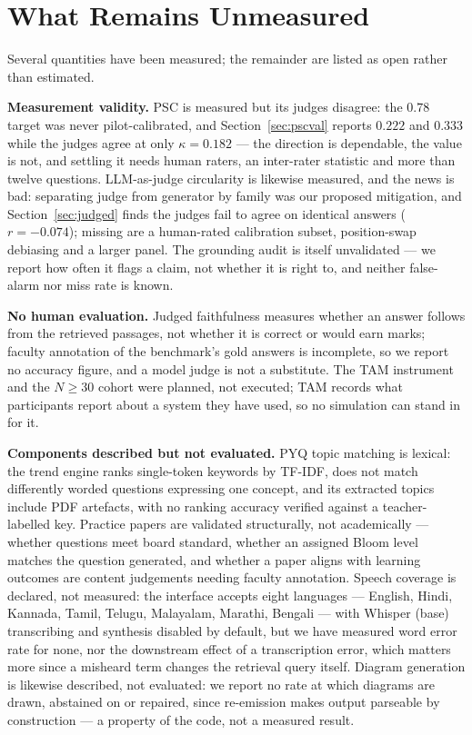 \documentclass[conference]{IEEEtran}
\begin{document}
\section{What Remains Unmeasured}
\label{sec:limits}
Several quantities have been measured; the remainder are listed as open rather
than estimated.

\textbf{Measurement validity.} PSC is measured but its judges disagree: the
$0.78$ target was never pilot-calibrated, and Section~\ref{sec:pscval} reports
$0.222$ and $0.333$ while the judges agree at only $\kappa = 0.182$ --- the
direction is dependable, the value is not, and settling it needs human raters,
an inter-rater statistic and more than twelve questions. LLM-as-judge
circularity is likewise measured, and the news is bad: separating judge from
generator by family was our proposed mitigation, and
Section~\ref{sec:judged} finds the judges fail to agree on identical answers
($r = -0.074$); missing are a human-rated calibration subset, position-swap
debiasing and a larger panel. The grounding audit is itself unvalidated --- we
report how often it flags a claim, not whether it is right to, and neither
false-alarm nor miss rate is known.

\textbf{No human evaluation.} Judged faithfulness measures whether an answer
follows from the retrieved passages, not whether it is correct or would earn
marks; faculty annotation of the benchmark's gold answers is incomplete, so we
report no accuracy figure, and a model judge is not a substitute. The TAM
instrument~\cite{davis1989} and the $N \geq 30$ cohort were planned, not
executed; TAM records what participants report about a system they have used, so
no simulation can stand in for it.

\textbf{Components described but not evaluated.} PYQ topic matching is lexical:
the trend engine ranks single-token keywords by TF-IDF, does not match
differently worded questions expressing one concept, and its extracted topics
include PDF artefacts, with no ranking accuracy verified against a
teacher-labelled key. Practice papers are validated structurally, not
academically --- whether questions meet board standard, whether an assigned
Bloom level matches the question generated, and whether a paper aligns with
learning outcomes are content judgements needing faculty annotation. Speech
coverage is declared, not measured: the interface accepts eight languages ---
English, Hindi, Kannada, Tamil, Telugu, Malayalam, Marathi, Bengali --- with
Whisper (base) transcribing and synthesis disabled by default, but we have
measured word error rate for none, nor the downstream effect of a transcription
error, which matters more since a misheard term changes the retrieval query
itself. Diagram generation is likewise described, not evaluated: we report no
rate at which diagrams are drawn, abstained on or repaired, since re-emission
makes output parseable by construction --- a property of the code, not a
measured result.
\end{document}
